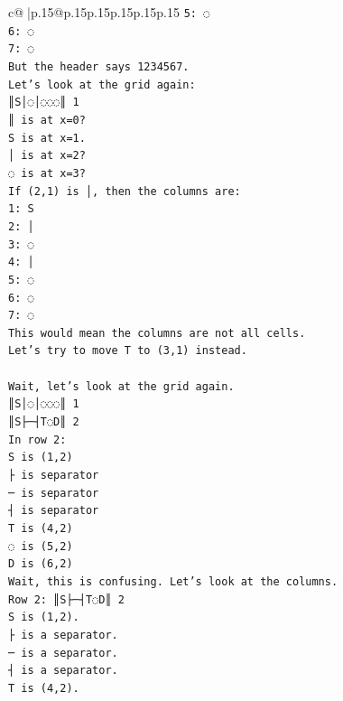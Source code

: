 \documentclass{article}
\begin{document}
{\begin{supertabular}{c@{$\;$}|p{.15\linewidth}@{}p{.15\linewidth}p{.15\linewidth}p{.15\linewidth}p{.15\linewidth}p{.15\linewidth}}
{{{\texttt{5: ◌} \\
\texttt{6: ◌} \\
\texttt{7: ◌} \\
\texttt{But the header says 1234567.} \\
\texttt{Let's look at the grid again:} \\
\texttt{║S│◌│◌◌◌║ 1} \\
\texttt{║ is at x=0?} \\
\texttt{S is at x=1.} \\
\texttt{│ is at x=2?} \\
\texttt{◌ is at x=3?} \\
\texttt{If (2,1) is │, then the columns are:} \\
\texttt{1: S} \\
\texttt{2: │} \\
\texttt{3: ◌} \\
\texttt{4: │} \\
\texttt{5: ◌} \\
\texttt{6: ◌} \\
\texttt{7: ◌} \\
\texttt{This would mean the columns are not all cells.} \\
\texttt{Let's try to move T to (3,1) instead.} \\
\\ 
\texttt{Wait, let's look at the grid again.} \\
\texttt{║S│◌│◌◌◌║ 1} \\
\texttt{║S├─┤T◌D║ 2} \\
\texttt{In row 2:} \\
\texttt{S is (1,2)} \\
\texttt{├ is separator} \\
\texttt{─ is separator} \\
\texttt{┤ is separator} \\
\texttt{T is (4,2)} \\
\texttt{◌ is (5,2)} \\
\texttt{D is (6,2)} \\
\texttt{Wait, this is confusing. Let's look at the columns.} \\
\texttt{Row 2: ║S├─┤T◌D║ 2} \\
\texttt{S is (1,2).} \\
\texttt{├ is a separator.} \\
\texttt{─ is a separator.} \\
\texttt{┤ is a separator.} \\
\texttt{T is (4,2).} \\
}}}
\end{supertabular}}
\end{document}
